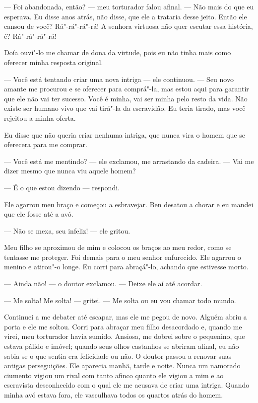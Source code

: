 --- Foi abandonada, então? --- meu torturador falou afinal. --- Não mais
do que eu esperava. Eu disse anos atrás, não disse, que ele a trataria
desse jeito. Então ele cansou de você? Rá"-rá"-rá"-rá! A senhora virtuosa
não quer escutar essa história, é? Rá"-rá"-rá"-rá!

Doía ouvi"-lo me chamar de dona da virtude, pois eu não tinha mais como
oferecer minha resposta original.

--- Você está tentando criar uma nova intriga --- ele continuou. --- Seu
novo amante me procurou e se oferecer para comprá"-la, mas estou aqui
para garantir que ele não vai ter sucesso. Você é minha, vai ser minha
pelo resto da vida. Não existe ser humano vivo que vai tirá"-la da
escravidão. Eu teria tirado, mas você rejeitou a minha oferta.

Eu disse que não queria criar nenhuma
intriga, que nunca vira o homem que se oferecera para me comprar.

--- Você está me mentindo? --- ele
exclamou, me arrastando da cadeira. --- Vai me dizer mesmo que nunca viu
aquele homem?

--- É o que estou dizendo --- respondi.

Ele agarrou meu braço e começou a
esbravejar. Ben desatou a chorar e eu mandei que ele fosse até a avó.

--- Não se mexa, seu infeliz! --- ele
gritou.

Meu filho se aproximou de mim e colocou os braços ao meu redor, como se
tentasse me proteger. Foi demais para o meu senhor enfurecido. Ele
agarrou o menino e atirou"-o longe. Eu corri para abraçá"-lo, achando que
estivesse morto.

--- Ainda não! --- o doutor exclamou.
--- Deixe ele aí até acordar.

--- Me solta! Me solta! --- gritei. ---
Me solta ou eu vou chamar todo mundo.

Continuei a me debater até escapar, mas ele me pegou de novo. Alguém
abriu a porta e ele me soltou. Corri para abraçar meu filho desacordado
e, quando me virei, meu torturador havia sumido. Ansiosa, me dobrei
sobre o pequenino, que estava pálido e imóvel; quando seus olhos
castanhos se abriram afinal, eu não sabia se o que sentia era felicidade
ou não. O doutor passou a renovar suas antigas perseguições. Ele
aparecia manhã, tarde e noite. Nunca um namorado ciumento vigiou um
rival com tanto afinco quanto ele vigiou a mim e ao escravista
desconhecido com o qual ele me acusava de criar uma intriga. Quando
minha avó estava fora, ele vasculhava todos os quartos atrás do homem.

